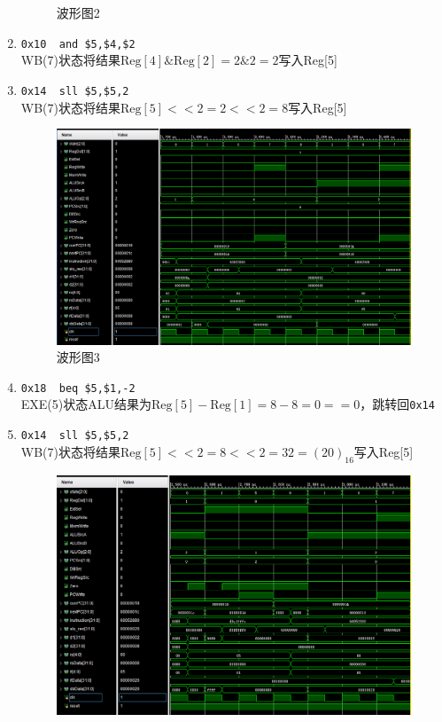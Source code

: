 \begin{enumerate}
\begin{figure}[H]
\caption{波形图2}
\label{fig:wave_2}
\end{figure}
    \item \verb'0x10  and $5,$4,$2'\\
    WB(7)状态将结果$\mathrm{Reg}[4]\&\mathrm{Reg}[2]=2\&2=2$写入Reg[5]
    \item \verb'0x14  sll $5,$5,2'\\
    WB(7)状态将结果$\mathrm{Reg}[5]<<2=2<<2=8$写入Reg[5]
\begin{figure}[H]
\centering
\includegraphics[width=0.9\linewidth]{fig/FullIns/Ins3.PNG}
\caption{波形图3}
\label{fig:wave_3}
\end{figure}
    \item \verb'0x18  beq $5,$1,-2'\\
    EXE(5)状态ALU结果为$\mathrm{Reg}[5]-\mathrm{Reg}[1]=8-8=0==0$，跳转回\verb'0x14'
    \item \verb'0x14  sll $5,$5,2'\\
    WB(7)状态将结果$\mathrm{Reg}[5]<<2=8<<2=32=(20)_{16}$写入Reg[5]
\begin{figure}[H]
\centering
\includegraphics[width=\linewidth]{fig/FullIns/Ins4.PNG}

\end{figure}
\end{enumerate}

